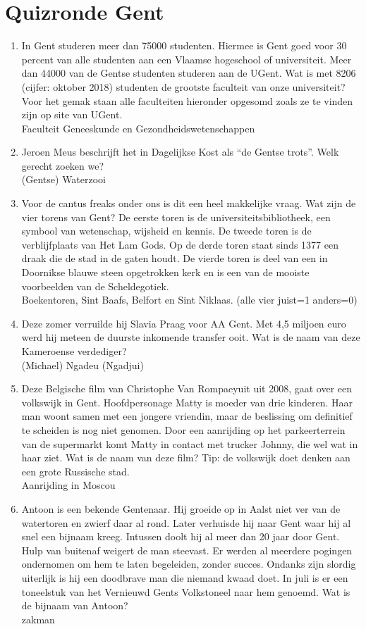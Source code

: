 \section{Quizronde Gent}
\begin{enumerate}
\item{In Gent studeren meer dan 75000 studenten. Hiermee is Gent goed voor 30 percent van alle studenten aan een Vlaamse hogeschool of universiteit. Meer dan 44000 van de Gentse studenten studeren aan de UGent. Wat is met 8206 (cijfer: oktober 2018) studenten de grootste faculteit van onze universiteit? Voor het gemak staan alle faculteiten hieronder opgesomd zoals ze te vinden zijn op site van UGent.\\ Faculteit Geneeskunde en Gezondheidswetenschappen}
\item{Jeroen Meus beschrijft het in Dagelijkse Kost als “de Gentse trots”. Welk gerecht zoeken we?\\ (Gentse) Waterzooi}
\item{Voor de cantus freaks onder ons is dit een heel makkelijke vraag. Wat zijn de vier torens van Gent? De eerste toren is de universiteitsbibliotheek, een symbool van wetenschap, wijsheid en kennis. De tweede toren is de verblijfplaats van Het Lam Gods. Op de derde toren staat sinds 1377 een draak die de stad in de gaten houdt. De vierde toren is deel van een in Doornikse blauwe steen opgetrokken kerk en is een van de mooiste voorbeelden van de Scheldegotiek.\\ Boekentoren, Sint Baafs, Belfort en Sint Niklaas.       (alle vier juist=1 anders=0)}
\item{Deze zomer verruilde hij Slavia Praag voor AA Gent. Met 4,5 miljoen euro werd hij meteen de duurste inkomende transfer ooit. Wat is de naam van deze Kameroense verdediger?\\ (Michael) Ngadeu (Ngadjui)}
\item{Deze  Belgische film van Christophe Van Rompaeyuit uit 2008, gaat over een volkswijk in Gent. Hoofdpersonage Matty is moeder van drie kinderen. Haar man woont samen met een jongere vriendin, maar de beslissing om definitief te scheiden is nog niet genomen. Door een aanrijding op het parkeerterrein van de supermarkt komt Matty in contact met trucker Johnny, die wel wat in haar ziet. Wat is de naam van deze film?
Tip: de volkswijk doet denken aan een grote Russische stad.\\Aanrijding in Moscou}
\item{Antoon is een bekende Gentenaar. Hij groeide op in Aalst niet ver van de watertoren en zwierf daar al rond. Later verhuisde hij naar Gent waar hij al snel een bijnaam kreeg. Intussen doolt hij al meer dan 20 jaar door Gent. Hulp van buitenaf weigert de man steevast. Er werden al meerdere pogingen ondernomen om hem te laten begeleiden, zonder succes. Ondanks zijn slordig uiterlijk is hij een doodbrave man die niemand kwaad doet. In juli is er een toneelstuk van het Vernieuwd Gents Volkstoneel naar hem genoemd. Wat is de bijnaam van Antoon?\\ zakman}

\end{enumerate}
